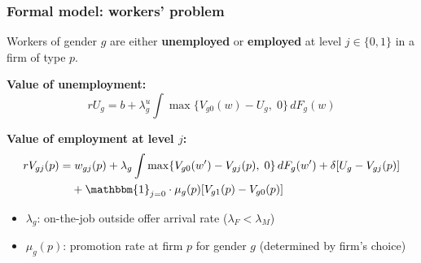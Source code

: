 \documentclass[aspectratio=169, 11pt]{beamer}
\begin{document}
\begin{frame}[label=model-formal]
\frametitle{Formal model: workers' problem}

\small
Workers of gender $g$ are either \textbf{unemployed} or \textbf{employed} at level $j \in \{0,1\}$ in a firm of type $p$.

\vspace{0.2cm}
\textbf{Value of unemployment:}
\begin{equation*}
    rU_g = b + \lambda_g^u \int \max\{V_{g0}(w) - U_g,\; 0\} \, dF_g(w)
\end{equation*}

\textbf{Value of employment at level $j$:}
\begin{align*}
    rV_{gj}(p) = & \; w_{gj}(p) + \lambda_g \int \max\{V_{g0}(w') - V_{gj}(p),\; 0\} \, dF_g(w') + \delta[U_g - V_{gj}(p)] \\
    & + \mathbbm{1}_{j=0} \cdot \mu_g(p)[V_{g1}(p) - V_{g0}(p)]
\end{align*}

\begin{itemize}
    \item $\lambda_g$: on-the-job outside offer arrival rate (\textbf{$\lambda_F < \lambda_M$})
    \item $\mu_g(p)$: promotion rate at firm $p$ for gender $g$ (determined by firm's choice)
\end{itemize}

\hfill\hyperlink{retentionslide}{}

\end{frame}
\end{document}
